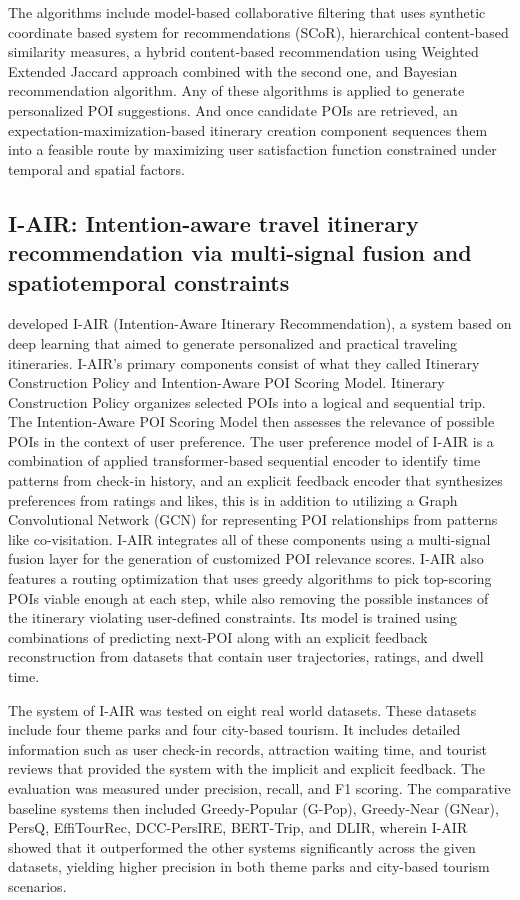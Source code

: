The algorithms include model-based collaborative filtering that uses synthetic coordinate based system for recommendations (SCoR), hierarchical content-based similarity measures, a hybrid content-based recommendation using Weighted Extended Jaccard approach combined with the second one, and Bayesian recommendation algorithm. Any of these algorithms is applied to generate personalized POI suggestions. And once candidate POIs are retrieved, an expectation-maximization-based itinerary creation component sequences them into a feasible route by maximizing user satisfaction function constrained under temporal and spatial factors.


\subsection{I-AIR: Intention-aware travel itinerary recommendation via multi-signal fusion and spatiotemporal constraints}

\textcite{Cui2025} developed I-AIR (Intention-Aware Itinerary Recommendation), a system based on deep learning that aimed to generate personalized and practical traveling itineraries. I-AIR’s primary components consist of what they called Itinerary Construction Policy and Intention-Aware POI Scoring Model. Itinerary Construction Policy organizes selected POIs into a logical and sequential trip. The Intention-Aware POI Scoring Model then assesses the relevance of possible POIs in the context of user preference. The user preference model of I-AIR is a combination of applied transformer-based sequential encoder to identify time patterns from check-in history, and an explicit feedback encoder that synthesizes preferences from ratings and likes, this is in addition to utilizing a Graph Convolutional Network (GCN) for representing POI relationships from patterns like co-visitation. I-AIR integrates all of these components using a multi-signal fusion layer for the generation of customized POI relevance scores. I-AIR also features a routing optimization that uses greedy algorithms to pick top-scoring POIs viable enough at each step, while also removing the possible instances of the itinerary violating user-defined constraints. Its model is trained using combinations of predicting next-POI along with an explicit feedback reconstruction from datasets that contain user trajectories, ratings, and dwell time.

The system of I-AIR was tested on eight real world datasets. These datasets include four theme parks and four city-based tourism. It includes detailed information such as user check-in records, attraction waiting time, and tourist reviews that provided the system with the implicit and explicit feedback. The evaluation was measured under precision, recall, and F1 scoring. The comparative baseline systems then included Greedy-Popular (G-Pop), Greedy-Near (GNear), PersQ, EffiTourRec, DCC-PersIRE, BERT-Trip, and DLIR, wherein I-AIR showed that it outperformed the other systems significantly across the given datasets, yielding higher precision in both theme parks and city-based tourism scenarios.

